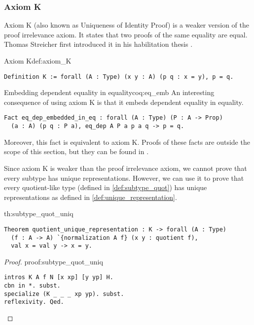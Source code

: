 \subsubsection{Axiom K}
Axiom K (also known as Uniqueness of Identity Proof) is a weaker version of the proof irrelevance axiom. It states that two proofs of the same equality are equal. Thomas Streicher first introduced it in his habilitation thesis \cite{Streicher}.
\begin{defi}{Axiom K}{def:axiom_K}
\begin{verbatim}
Definition K := forall (A : Type) (x y : A) (p q : x = y), p = q.
\end{verbatim}
\end{defi}
\begin{coq}{Embedding dependent equality in equality}{coq:eq_emb}
An interesting consequence of using axiom K is that it embeds dependent equality in equality.
\begin{verbatim}
Fact eq_dep_embedded_in_eq : forall (A : Type) (P : A -> Prop)
  (a : A) (p q : P a), eq_dep A P a p a q -> p = q.
\end{verbatim}
Moreover, this fact is equivalent to axiom K. Proofs of these facts are outside the scope of this section, but they can be found in .
\end{coq}
Since axiom K is weaker than the proof irrelevance axiom, we cannot prove that every subtype has unique representations. However, we can use it to prove that every quotient-like type (defined in \ref{def:subtype_quot}) has unique representations as defined in \ref{def:unique_representation}.
\begin{theo}{}{th:subtype_quot_uniq}
\begin{verbatim}
Theorem quotient_unique_representation : K -> forall (A : Type) 
  (f : A -> A) `{normalization A f} (x y : quotient f),
  val x = val y -> x = y.
\end{verbatim}
\end{theo}
\begin{proof}{}{proof:subtype_quot_uniq}
\begin{verbatim}
intros K A f N [x xp] [y yp] H. 
cbn in *. subst. 
specialize (K _ _ _ xp yp). subst. 
reflexivity. Qed.
\end{verbatim}
\end{proof}
